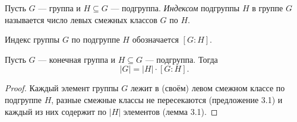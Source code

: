 \begin{definition}
    Пусть $G$ --- группа и $H \subseteq G$ --- подгруппа. \textit{Индексом} подгруппы $H$ в группе $G$ называется число левых смежных классов $G$ по $H$.
\end{definition}

Индекс группы $G$ по подгруппе $H$ обозначается $\left[G : H\right]$.

\begin{theorem} Пусть $G$ --- конечная группа и $H \subseteq G$ --- подгруппа. Тогда
    \begin{equation*}
        |G| = |H| \cdot \left[G : H\right]
    .\end{equation*}
\end{theorem}

\begin{proof}
    Каждый элемент группы $G$ лежит в (своём) левом смежном классе по подгруппе $H$, разные смежные классы не пересекаются (предложение 3.1) и каждый из них содержит по $|H|$ элементов (лемма 3.1).
\end{proof}
